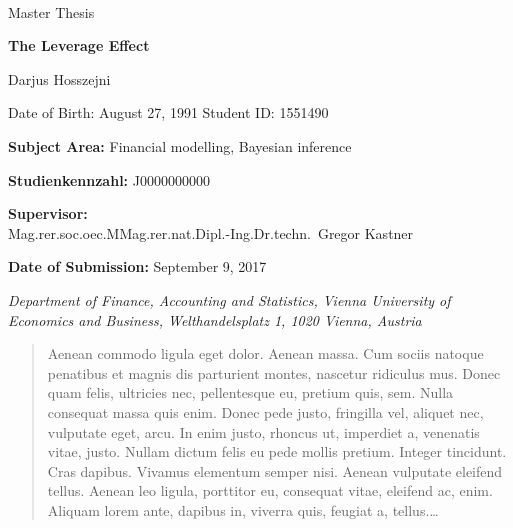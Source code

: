 \documentclass[a4paper, 12pt, twppages]{article}
\newcommand\BackgroundPic{%
\put(0,0){%
\parbox[b][\paperheight]{\paperwidth}{%
\vfill
\centering
\texttt{[image: background.pdf]}%
\vfill
}}}
\begin{document}

\pagebreak

\AddToShipoutPicture*{\BackgroundPic}
\thispagestyle{fancy}


{\vspace{2cm}~}
{\vspace{2cm}}

{\noindent\large Master Thesis}


\vspace{1cm}

{\noindent\huge\textbf{The Leverage Effect}}

\bigskip

{\noindent\LARGE Darjus Hosszejni}

\bigskip
{\noindent\small Date of Birth: August 27, 1991}\newline
{\noindent\small Student ID: 1551490}

\bigskip
{\vspace{2cm}}
{\noindent\large {\bf Subject Area:} Financial modelling, Bayesian inference}

\bigskip
{\noindent\large {\bf Studienkennzahl:} J0000000000}

\bigskip


{\noindent\large {\bf Supervisor:}\\ Mag.rer.soc.oec.MMag.rer.nat.Dipl.-Ing.Dr.techn.~Gregor Kastner}

\bigskip

{\noindent\large {\bf Date of Submission:} September 9, 2017}

\bigskip\bigskip\bigskip\bigskip\bigskip\bigskip

{\em\noindent Department of Finance, Accounting and Statistics, Vienna University of
Economics and Business, Welthandelsplatz 1, 1020 Vienna, Austria
}


\pagestyle{empty}
\pagebreak
\tableofcontents
\pagebreak
\listoffigures
\pagebreak
\listoftables
\pagebreak


\begin{abstract}
Aenean commodo ligula eget dolor. Aenean massa. Cum sociis natoque penatibus et magnis dis parturient montes, nascetur ridiculus mus. Donec quam felis, ultricies nec, pellentesque eu, pretium quis, sem. Nulla consequat massa quis enim. Donec pede justo, fringilla vel, aliquet nec, vulputate eget, arcu. In enim justo, rhoncus ut, imperdiet a, venenatis vitae, justo. Nullam dictum felis eu pede mollis pretium. Integer tincidunt. Cras dapibus. Vivamus elementum semper nisi. Aenean vulputate eleifend tellus. Aenean leo ligula, porttitor eu, consequat vitae, eleifend ac, enim. Aliquam lorem ante, dapibus in, viverra quis, feugiat a, tellus.\dots
\end{abstract}

\pagebreak







\end{document}
